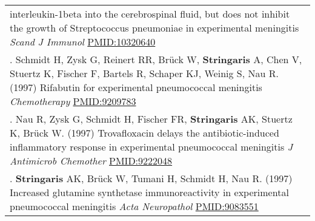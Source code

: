 \documentclass[
]{article}
\begin{document}
\begin{longtable}[]{@{}
  >{\raggedright\arraybackslash}p{}@{}}
interleukin-1beta into the cerebrospinal fluid, but does not inhibit the
growth of Streptococcus pneumoniae in experimental meningitis
\emph{Scand J Immunol} \url{PMID:10320640} \\
203. Schmidt H, Zysk G, Reinert RR, Brück W, \textbf{Stringaris} A, Chen
V, Stuertz K, Fischer F, Bartels R, Schaper KJ, Weinig S, Nau R. (1997)
Rifabutin for experimental pneumococcal meningitis \emph{Chemotherapy}
\url{PMID:9209783} \\
204. Nau R, Zysk G, Schmidt H, Fischer FR, \textbf{Stringaris} AK,
Stuertz K, Brück W. (1997) Trovafloxacin delays the antibiotic-induced
inflammatory response in experimental pneumococcal meningitis \emph{J
Antimicrob Chemother} \url{PMID:9222048} \\
205. \textbf{Stringaris} AK, Brück W, Tumani H, Schmidt H, Nau R. (1997)
Increased glutamine synthetase immunoreactivity in experimental
pneumococcal meningitis \emph{Acta Neuropathol} \url{PMID:9083551} \\
\end{longtable}
\end{document}
